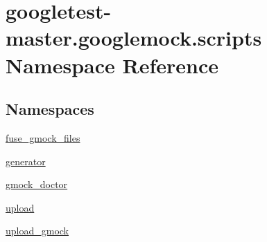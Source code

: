 \hypertarget{namespacegoogletest-master_1_1googlemock_1_1scripts}{}\section{googletest-\/master.googlemock.\+scripts Namespace Reference}
\label{namespacegoogletest-master_1_1googlemock_1_1scripts}
\subsection*{Namespaces}
\begin{DoxyCompactItemize}
\item 
 \mbox{\hyperlink{namespacegoogletest-master_1_1googlemock_1_1scripts_1_1fuse__gmock__files}{fuse\+\_\+gmock\+\_\+files}}
\item 
 \mbox{\hyperlink{namespacegoogletest-master_1_1googlemock_1_1scripts_1_1generator}{generator}}
\item 
 \mbox{\hyperlink{namespacegoogletest-master_1_1googlemock_1_1scripts_1_1gmock__doctor}{gmock\+\_\+doctor}}
\item 
 \mbox{\hyperlink{namespacegoogletest-master_1_1googlemock_1_1scripts_1_1upload}{upload}}
\item 
 \mbox{\hyperlink{namespacegoogletest-master_1_1googlemock_1_1scripts_1_1upload__gmock}{upload\+\_\+gmock}}
\end{DoxyCompactItemize}
